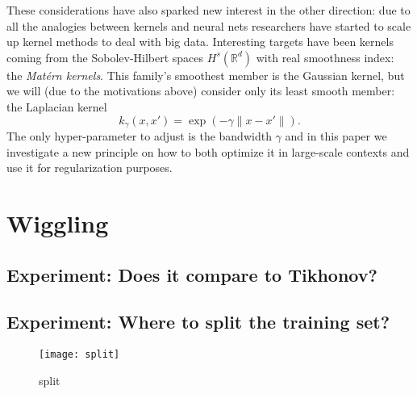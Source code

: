 \documentclass[12pt]{amsart}
\newcommand{\R}{\mathbb{R}}
\begin{document}
These considerations have also sparked new interest in the other direction:
due to all the analogies between kernels and neural nets researchers have
started to scale up kernel methods to deal with big data.
Interesting targets have been kernels coming from the Sobolev-Hilbert spaces
$H^s(\R^d)$ with real smoothness index: the \emph{Matérn kernels}.
This family's smoothest member is the Gaussian kernel, but we will (due to 
the motivations above) consider only its least smooth member: the Laplacian
kernel
\[ k_\gamma(x,x') = \exp(-\gamma \| x - x' \|). \]
The only hyper-parameter to adjust is the bandwidth $\gamma$ and in this 
paper we investigate a new principle on how to both optimize it in 
large-scale contexts and use it for regularization purposes.

\section{Wiggling}





\subsection{Experiment: Does it compare to Tikhonov?}



\subsection{Experiment: Where to split the training set?}

\begin{figure}[htp]
    \centering
    \texttt{[image: split]}
    \caption{split}
    \label{fig:split}
\end{figure}
\end{document}
